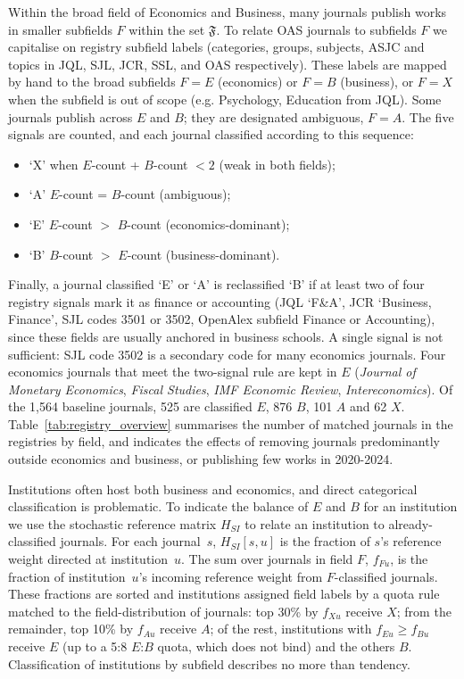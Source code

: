 Within the broad field of Economics and Business, many journals publish works in smaller subfields $F$ within the set $\mathfrak{F}$. To relate OAS journals to subfields ${F}$ we capitalise on registry subfield labels (categories, groups, subjects, ASJC and topics in JQL, SJL, JCR, SSL, and OAS respectively). These labels are mapped by hand to the broad subfields $F=E$ (economics) or $F=B$ (business), or $F=X$ when the subfield is out of scope (e.g. Psychology, Education from JQL). Some journals publish across $E$ and $B$; they are designated ambiguous, $F=A$. The five signals are counted, and each journal classified according to this sequence:
\begin{itemize}
	\setlength{\itemsep}{0pt}
	\item `X' when $E$-count + $B$-count $< 2$ (weak in both fields);
	\item `A' $E$-count = $B$-count (ambiguous);
	\item `E' $E$-count $>$ $B$-count (economics-dominant);
	\item `B' $B$-count $>$ $E$-count (business-dominant).
\end{itemize}
Finally, a journal classified `E' or `A' is reclassified `B' if at least two of four registry signals mark it as finance or accounting (JQL `F\&A', JCR `Business, Finance', SJL codes 3501 or 3502, OpenAlex subfield Finance or Accounting), since these fields are usually anchored in business schools. A single signal is not sufficient: SJL code 3502 is a secondary code for many economics journals. Four economics journals that meet the two-signal rule are kept in $E$ (\textit{Journal of Monetary Economics}, \textit{Fiscal Studies}, \textit{IMF Economic Review}, \textit{Intereconomics}). Of the 1,564 baseline journals, 525 are classified $E$, 876 $B$, 101 $A$ and 62 $X$.
Table~\ref{tab:registry_overview} summarises the number of matched journals in the registries by field, and indicates the effects of removing journals predominantly outside economics and business, or publishing few works in 2020-2024. 

Institutions often host both business and economics, and direct categorical classification is problematic. 
To indicate the balance of $E$ and $B$ for an institution
we use the stochastic reference matrix $H_{SI}$ to relate an institution to already-classified journals. For each journal~$s$, $H_{SI}[s,u]$ is the fraction of $s$'s reference weight directed at institution~$u$. 
The sum over journals in field $F$, $f_{Fu}$, is the fraction of institution~$u$'s incoming reference weight from $F$-classified journals. These fractions are sorted and institutions assigned field labels by a quota rule matched to the field-distribution of journals: top 30\% by $f_{Xu}$ receive $X$; from the remainder, top 10\% by $f_{Au}$ receive $A$; of the rest, institutions with $f_{Eu}\geq f_{Bu}$ receive $E$ (up to a 5:8 $E$:$B$ quota, which does not bind) and the others $B$. Classification of institutions by subfield describes no more than tendency.

